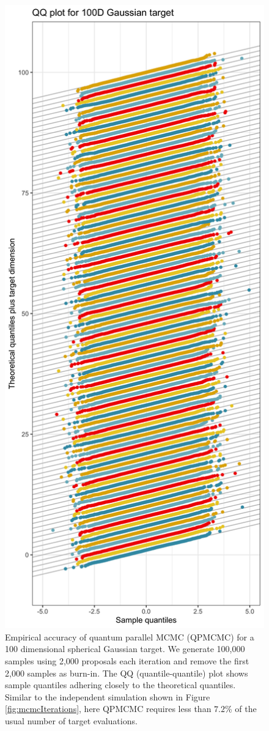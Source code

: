 \documentclass[12pt]{article} %
\begin{document}
 \begin{figure}[ph!]
	\centering
	\includegraphics[width=0.5\linewidth]{qqPlot.png}
	\caption{Empirical accuracy of quantum parallel MCMC (QPMCMC) for a 100 dimensional spherical Gaussian target.  We generate 100,000 samples using 2,000 proposals each iteration and remove the first 2,000 samples as burn-in.  The QQ (quantile-quantile) plot shows sample quantiles adhering closely to the theoretical quantiles.  Similar to the independent simulation shown in Figure \ref{fig:mcmcIterations}, here QPMCMC requires less than $7.2$\% of the usual number of target evaluations.}\label{fig:qq}
\end{figure}
\end{document}

